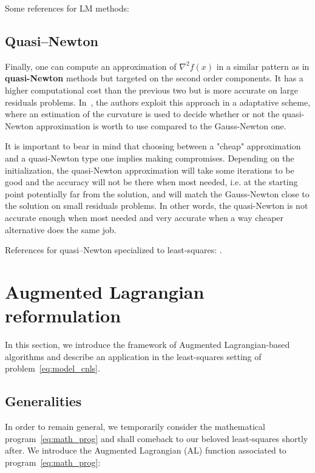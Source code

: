 \documentclass[10pt]{article}
\numberwithin{equation}{section}
\begin{document}
	 Some references for LM methods: \cite{bellavia-etal:2018}
	 
	 \subsection{Quasi--Newton}
	 
	 Finally, one can compute an approximation of $\nabla^2f(x)$ in a similar pattern as in \textbf{quasi-Newton} methods \cite[][Chapter 6]{nocedalwright:2006} but targeted on the second order components. It has a higher computational cost than the previous two but is more accurate on large residuals problems. In~\cite{dennisetal:1981}, the authors exploit this approach in a adaptative scheme, where an estimation of the curvature is used to decide whether or not the quasi-Newton approximation is worth to use compared to the Gauss-Newton one.
	 
	 It is important to bear in mind that choosing between a "cheap" approximation and a quasi-Newton type one implies making compromises. Depending on the initialization, the quasi-Newton approximation will take some iterations to be good and the accuracy will not be there when most needed, i.e. at the starting point potentially far from the solution, and will match the Gauss-Newton close to the solution on small residuals problems. In other words, the quasi-Newton is not accurate enough when most needed and very accurate when a way cheaper alternative does the same job.
	 
	 References for quasi--Newton specialized to least-squares: \cite{dennisetal:1981,yabetakahashi}.
	 
	 \section{Augmented Lagrangian reformulation}\label{sec:about_al}
	 
	 In this section, we introduce the framework of Augmented Lagrangian-based algorithms and describe an application in the least-squares setting of problem~\eqref{eq:model_cnls}.
	 
	 \subsection{Generalities}
	 
	 In order to remain general, we temporarily consider the mathematical program~\eqref{eq:math_prog} and shall comeback to our beloved least-squares shortly after. 
	 We introduce the Augmented Lagrangian (AL) function associated to program~\eqref{eq:math_prog}:
	 
\end{document}
